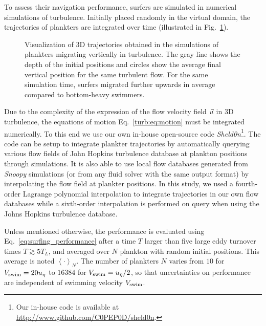 To assess their navigation performance, surfers are simulated in numerical simulations of turbulence.
Initially placed randomly in the virtual domain, the trajectories of plankters are integrated over time (illustrated in Fig.~\ref{fig:turbulence_trajectories}).
\begin{figure}[t]
	\centering
	\def\svgwidth{0.65\textwidth}
	
	\caption[Visualization of 3D trajectories obtained in the simulations of plankters migrating vertically in turbulence.]{
  		Visualization of 3D trajectories obtained in the simulations of plankters migrating vertically in turbulence.
  		The gray line shows the depth of the initial positions and circles show the average final vertical position for the same turbulent flow.
  		For the same simulation time, surfers migrated further upwards in average compared to bottom-heavy swimmers.
  	}
	\label{fig:turbulence_trajectories}
\end{figure}
Due to the complexity of the expression of the flow velocity field $\vec{u}$ in 3D turbulence, the equations of motion Eq.~\eqref{turb:eq:motion} must be integrated numerically. 
To this end we use our own in-house open-source code \textit{Sheld0n}\footnote{Our in-house code is available at \url{http://www.github.com/C0PEP0D/sheld0n}.}.
The code can be setup to integrate plankter trajectories by automatically querying various flow fields of John Hopkins turbulence database at plankton positions through simulations.
It is also able to use local flow databases generated from \textit{Snoopy} simulations (or from any fluid solver with the same output format) by interpolating the flow field at plankter positions.
In this study, we used a fourth-order Lagrange polynomial interpolation to integrate trajectories in our own flow databases while a sixth-order interpolation is performed on query when using the Johns Hopkins turbulence database.

Unless mentioned otherwise, the performance is evaluated using Eq.~\eqref{eq:surfing_performance} after a time $T$ larger than five large eddy turnover times $T \gtrsim 5 T_L$, and averaged over $N$ plankton with random initial positions.
This average is noted $\left\langle \cdot \right\rangle_N$.
The number of plankters $N$ varies from $10$ for $V_{\mathrm{swim}} = 20 u_{\eta}$ to $16384$ for $V_{\mathrm{swim}} = u_{\eta}/2$, so that uncertainties on performance are independent of swimming velocity $V_{\mathrm{swim}}$.


